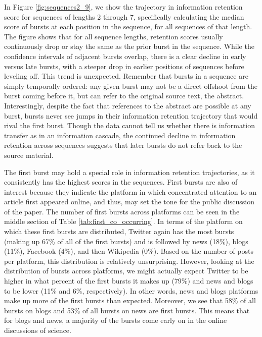 \documentclass[letterpaper]{article} %
\begin{document}
In Figure \ref{fig:sequences2_9}, we show the trajectory in information retention score for sequences of lengths 2 through 7, specifically calculating the median score of bursts at each position in the sequence, for all sequences of that length. The figure shows that for all sequence lengths, retention scores usually continuously drop or stay the same as the prior burst in the sequence. While the confidence intervals of adjacent bursts overlap, there is a clear decline in early versus late bursts, with a steeper drop in earlier positions of sequences before leveling off. %
This trend is unexpected. Remember that bursts in a sequence are simply temporally ordered: any given burst may not be a direct offshoot from the burst coming before it, but can refer to the original source text, the abstract. Interestingly, despite the fact that references to the abstract are possible at any burst, bursts never see jumps in their information retention trajectory that would rival the first burst. Though the data cannot tell us whether there is information transfer as in an information cascade, the continued decline in information retention across sequences suggests that later bursts do not refer back to the source material.

The first burst may hold a special role in information retention trajectories, as it consistently has the highest scores in the sequences. First bursts are also of interest because they indicate the platform in which concentrated attention to an article first appeared online, and thus, may set the tone for the public discussion of the paper. The number of first bursts across platforms can be seen in the middle section of Table \ref{tab:first_co_occurring}. In terms of the platform on which these first bursts are distributed, Twitter again has the most bursts (making up 67\% of all of the first bursts) and is followed by news (18\%), blogs (11\%), Facebook (4\%), and then Wikipedia (0\%). Based on the number of posts per platform, this distribution is relatively unsurprising. However, looking at the distribution of bursts across platforms, we might actually expect Twitter to be higher in what percent of the first bursts it makes up (79\%) and news and blogs to be lower (11\% and 6\%, respectively). In other words, news and blogs platforms make up more of the first bursts than expected. Moreover, we see that 58\% of all bursts on blogs and 53\% of all bursts on news are first bursts. This means that for blogs and news, a majority of the bursts come early on in the online discussions of science.
\end{document}
